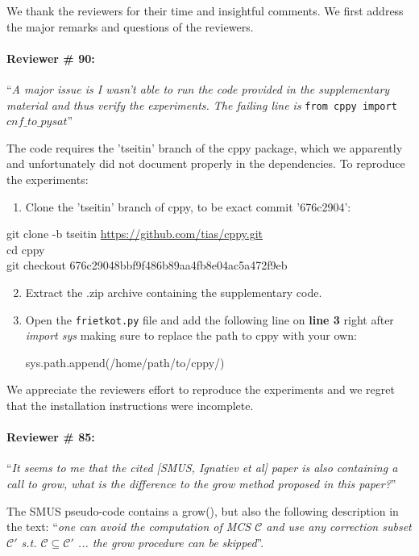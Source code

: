 \documentclass{article}
\begin{document}
We thank the reviewers for their time and insightful comments. We first address the major remarks and questions of the reviewers. 

\paragraph{Reviewer \# 90:} ``\textit{A major issue is I wasn't able to run the code provided in the supplementary material and thus verify the experiments. The failing line is} \texttt{from cppy import $cnf\_to\_pysat$}''

The code requires the 'tseitin' branch of the cppy package, which we apparently and unfortunately did not document properly in the dependencies. To reproduce the experiments:
\begin{enumerate}
	\item Clone the 'tseitin' branch of cppy, to be exact commit '676c2904':
\end{enumerate}
{\footnotesize git clone -b tseitin \url{https://github.com/tias/cppy.git}}\\
{\footnotesize cd cppy} \\
{\footnotesize {git checkout 676c29048bbf9f486b89aa4fb8e04ac5a472f9eb}} 
\begin{enumerate}
	\setcounter{enumi}{1}
	\item Extract the .zip archive containing the supplementary code.
	\item Open the \texttt{frietkot.py} file and add the following line on \textbf{line 3} right after \emph{import sys} making sure to replace the path to cppy with your own:
	\begin{center}
	{ sys.path.append(\textquotesingle/home/path/to/cppy/\textquotesingle)}	
	\end{center}
\end{enumerate}
We appreciate the reviewers effort to reproduce the experiments and we regret that the installation instructions were incomplete.


\paragraph{Reviewer \# 85:} ``\textit{It seems to me that the cited [SMUS, Ignatiev et al] paper is also containing a call to grow, what is the difference to the grow method proposed in this paper?}''

The SMUS pseudo-code contains a grow(), but also the following description in the text: ``\emph{one can avoid the computation of MCS $\mathcal{C}$ and use any correction subset $\mathcal{C}'$ s.t. $\mathcal{C} \subseteq \mathcal{C}'$ ... the grow procedure can be skipped}''.
\end{document}
